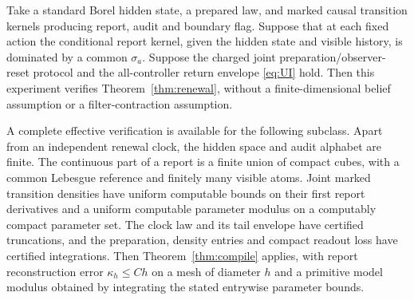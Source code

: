 \begin{theorem}\label{thm:hidden}
Take a standard Borel hidden state, a prepared law, and marked causal transition kernels producing report, audit and boundary flag. Suppose that at each fixed action the conditional report kernel, given the hidden state and visible history, is dominated by a common $\sigma_a$. Suppose the charged joint preparation/observer-reset protocol and the all-controller return envelope \eqref{eq:UI} hold. Then this experiment verifies Theorem~\ref{thm:renewal}, without a finite-dimensional belief assumption or a filter-contraction assumption.

A complete effective verification is available for the following subclass. Apart from an independent renewal clock, the hidden space and audit alphabet are finite. The continuous part of a report is a finite union of compact cubes, with a common Lebesgue reference and finitely many visible atoms. Joint marked transition densities have uniform computable bounds on their first report derivatives and a uniform computable parameter modulus on a computably compact parameter set. The clock law and its tail envelope have certified truncations, and the preparation, density entries and compact readout loss have certified integrations. Then Theorem~\ref{thm:compile} applies, with report reconstruction error $\kappa_h\le C h$ on a mesh of diameter $h$ and a primitive model modulus obtained by integrating the stated entrywise parameter bounds.
\end{theorem}
